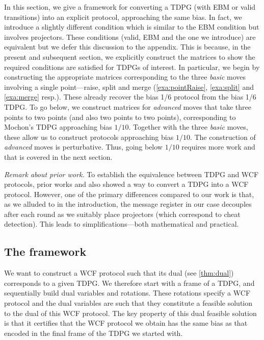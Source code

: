\documentclass{theoretics}
\newcommand{\atul}[1]{#1} %
\begin{document}
In this section, we give a framework for converting a TDPG (with EBM or valid transitions) into an explicit protocol, approaching the same bias. In fact, we introduce a slightly different condition which is similar to the EBM condition but involves projectors. These conditions (valid, EBM and the one we introduce) are equivalent but we defer this discussion to the appendix. %
This is because, in the present and subsequent section, we explicitly construct the matrices to show the required conditions are satisfied for TDPGs of interest. In particular, we begin by constructing the appropriate matrices corresponding to the three \emph{basic} moves involving a single point---raise, split and merge (\cref{exa:pointRaise}, \cref{exa:split} and \cref{exa:merge} resp.). These already recover the bias 1/6 protocol from the bias 1/6 TDPG. To go below, we construct matrices for \emph{advanced} moves that take three points to two points (and also two points to two points), corresponding to Mochon's TDPG approaching bias $1/10$. Together with the three \emph{basic} moves, these allow us to construct protocols approaching bias $1/10$. The construction of \emph{advanced} moves is perturbative. Thus, going below $1/10$ requires more work and that is covered in the next section. %

%
%
%
%


\emph{Remark about prior work.} To establish the equivalence between TDPG and WCF protocols, prior works \cite{ACG+14} and \cite{Mochon07} also showed a way to convert a TDPG into a WCF protocol. However, one of the primary differences compared to our work is that, as we \atul{alluded to in the introduction,} %
the message register in our case decouples after each round as we suitably place projectors (which correspond to cheat detection). This leads to simplifications---both mathematical and practical.

%
%

%

%
%


%
%
%
%

%
%
%
%
%
%
%


\subsection{The framework}
\label{subsec:framework}

We want to construct a WCF protocol such that its dual (see \cref{thm:dual}) corresponds to a given TDPG. We therefore start with a frame of a TDPG, and \atul{
  sequentially build dual variables and rotations. These rotations specify a WCF protocol and the dual variables are such that they constitute a feasible solution to the dual of this WCF protocol. The key property of this dual feasible solution is that it certifies that the WCF protocol we obtain has the same bias as that encoded in the final frame of the TDPG we started with.}
%
\end{document}
